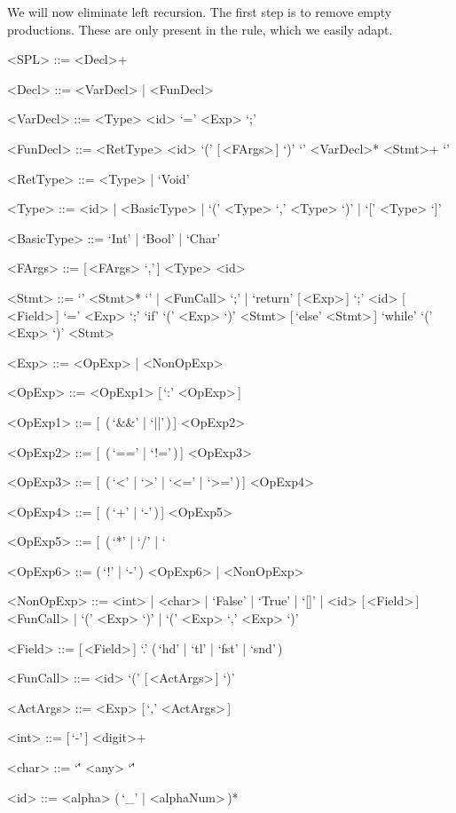 \documentclass{article}
\begin{document}
We will now eliminate left recursion.
The first step is to remove empty productions.
These are only present in the  rule, which we easily adapt.
\begin{grammar}
    <SPL> ::= <Decl>+

    <Decl> ::= <VarDecl> | <FunDecl>

    <VarDecl> ::= <Type> <id> `=' <Exp> `;'

    <FunDecl> ::= <RetType> <id> `(' [\,<FArgs>\,] `)' `{' <VarDecl>* <Stmt>+ `}'

    <RetType> ::= <Type> | `Void'

    <Type> ::= <id> | <BasicType> | `(' <Type> `,' <Type> `)' | `[' <Type> `]'

    <BasicType> ::= `Int' | `Bool' | `Char'

    <FArgs> ::= [\,<FArgs> `,'\,] <Type> <id>

    <Stmt> ::= `{' <Stmt>* `}' | <FunCall> `;' | `return' [\,<Exp>\,] `;'
    \alt <id> [\,<Field>\,] `=' <Exp> `;'
    \alt `if' `(' <Exp> `)' <Stmt> [\,`else' <Stmt>\,]
    \alt `while' `(' <Exp> `)' <Stmt>

    <Exp> ::= <OpExp> | <NonOpExp>

    <OpExp> ::= <OpExp1> [\,`:' <OpExp>\,]

    <OpExp1> ::= [\,<OpExp1> (\,`&&' | `||'\,)\,] <OpExp2>

    <OpExp2> ::= [\,<OpExp2> (\,`==' | `!='\,)\,] <OpExp3>

    <OpExp3> ::= [\,<OpExp3> (\,`<' | `>' | `<=' | `>='\,)\,] <OpExp4>

    <OpExp4> ::= [\,<OpExp4> (\,`+' | `-'\,)\,] <OpExp5>

    <OpExp5> ::= [\,<OpExp5> (\,`*' | `/' | `%

    <OpExp6> ::= (\,`!' | `-'\,) <OpExp6> | <NonOpExp>

    <NonOpExp> ::= <int> | <char> | `False' | `True' | `[]' | <id> [\,<Field>\,]
    \alt <FunCall> | `(' <Exp> `)' | `(' <Exp> `,' <Exp> `)'

    <Field> ::= [\,<Field>\,] `.' (\,`hd' | `tl' | `fst' | `snd'\,)

    <FunCall> ::= <id> `(' [\,<ActArgs>\,] `)'

    <ActArgs> ::= <Exp> [\,`,' <ActArgs>\,]

    <int> ::= [\,`-'\,] <digit>+

    <char> ::= `\'' <any> `\''

    <id> ::= <alpha> (\,`_' | <alphaNum>\,)*
\end{grammar}
\end{document}
